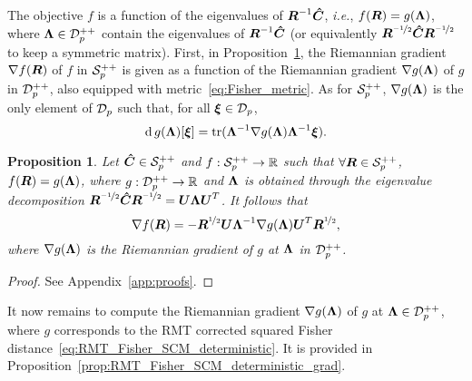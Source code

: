 \documentclass{article}
\theoremstyle{plain}
\newtheorem{proposition}[theorem]{Proposition}
\theoremstyle{definition}
\theoremstyle{remark}
\begin{document}
The objective $f$ is a function of the eigenvalues of $\boldsymbol{R}^{-1}\boldsymbol{\hat{C}}$, \emph{i.e.}, $f(\boldsymbol{R})=g(\boldsymbol{\Lambda})$, where $\boldsymbol{\Lambda}\in\mathcal{D}^{++}_{p}$ contain the eigenvalues of $\boldsymbol{R}^{-1}\boldsymbol{\hat{C}}$ (or equivalently $\boldsymbol{R}^{\nicefrac{-1}{2}}\boldsymbol{\hat{C}}\boldsymbol{R}^{\nicefrac{-1}{2}}$ to keep a symmetric matrix).
First, in Proposition~\ref{prop:Rgrad_eigsfun}, the Riemannian gradient $\nabla f(\boldsymbol{R})$ of $f$ in $\mathcal{S}^{++}_{p}$ is given as a function of the Riemannian gradient $\nabla g(\boldsymbol{\Lambda})$ of $g$ in $\mathcal{D}^{++}_{p}$, also equipped with metric~\eqref{eq:Fisher_metric}.
As for $\mathcal{S}^{++}_{p}$, $\nabla g(\boldsymbol{\Lambda})$ is the only element of $\mathcal{D}_{p}$ such that, for all $\boldsymbol{\xi}\in\mathcal{D}_{p}$,
\begin{equation*}
    \operatorname{d} g(\boldsymbol{\Lambda})[\boldsymbol{\xi}] = \operatorname{tr}(\boldsymbol{\Lambda}^{-1}\nabla g(\boldsymbol{\Lambda})\boldsymbol{\Lambda}^{-1}\boldsymbol{\xi}).
\end{equation*}
%
\begin{proposition}
\label{prop:Rgrad_eigsfun}
    Let $\boldsymbol{\hat{C}}\in\mathcal{S}^{++}_{p}$ and $f:\mathcal{S}^{++}_{p}\to\mathbb{R}$ such that $\forall\boldsymbol{R}\in\mathcal{S}^{++}_{p}$, $f(\boldsymbol{R})=g(\boldsymbol{\Lambda})$, where $g:\mathcal{D}^{++}_{p}\to\mathbb{R}$ and $\boldsymbol{\Lambda}$ is obtained through the eigenvalue decomposition $\boldsymbol{R}^{\nicefrac{-1}{2}}\boldsymbol{\hat{C}}\boldsymbol{R}^{\nicefrac{-1}{2}}=\boldsymbol{U}\boldsymbol{\Lambda}\boldsymbol{U}^T$.
    It follows that
    \begin{equation*}
        \nabla f(\boldsymbol{R}) = -\boldsymbol{R}^{\nicefrac12}\boldsymbol{U}\boldsymbol{\Lambda}^{-1}\nabla g(\boldsymbol{\Lambda})\boldsymbol{U}^T\boldsymbol{R}^{\nicefrac12},
    \end{equation*}
    where $\nabla g(\boldsymbol{\Lambda})$ is the Riemannian gradient of $g$ at $\boldsymbol{\Lambda}$ in $\mathcal{D}^{++}_{p}$.
\end{proposition}
\begin{proof}
    See Appendix~\ref{app:proofs}.
\end{proof}
%
It now remains to compute the Riemannian gradient $\nabla g(\boldsymbol{\Lambda})$ of $g$ at $\boldsymbol{\Lambda}\in\mathcal{D}^{++}_{p}$, where $g$ corresponds to the RMT corrected squared Fisher distance~\eqref{eq:RMT_Fisher_SCM_deterministic}.
It is provided in Proposition~\ref{prop:RMT_Fisher_SCM_deterministic_grad}.
%
\end{document}
